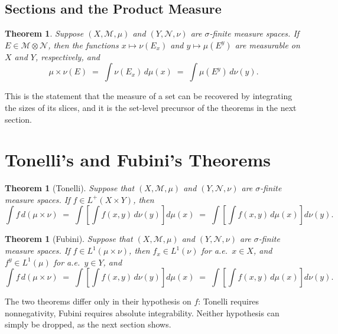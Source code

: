 \documentclass[11pt]{article}
\theoremstyle{definition}
\theoremstyle{plain}
\newtheorem{theorem}[definition]{Theorem}
\newcommand{\M}{\mathcal{M}}
\newcommand{\N}{\mathcal{N}}
\begin{document}
\subsection{Sections and the Product Measure}

\begin{theorem}
Suppose $(X,\M,\mu)$ and $(Y,\N,\nu)$ are $\sigma$-finite measure
spaces. If $E \in \M \otimes \N$, then the functions
$x \mapsto \nu(E_x)$ and $y \mapsto \mu(E^{y})$ are measurable on $X$
and $Y$, respectively, and
\[
  \mu \times \nu(E)
    \;=\; \int \nu(E_x) \,d\mu(x)
    \;=\; \int \mu(E^{y}) \,d\nu(y).
\]
\end{theorem}

This is the statement that the measure of a set can be recovered by
integrating the sizes of its slices, and it is the set-level precursor
of the theorems in the next section.

\section{Tonelli's and Fubini's Theorems}

\begin{theorem}[Tonelli]
Suppose that $(X,\M,\mu)$ and $(Y,\N,\nu)$ are $\sigma$-finite measure
spaces. If $f \in L^{+}(X \times Y)$, then
\[
  \int f \,d(\mu \times \nu)
    \;=\; \int \left[ \int f(x,y) \,d\nu(y) \right] d\mu(x)
    \;=\; \int \left[ \int f(x,y) \,d\mu(x) \right] d\nu(y).
\]
\end{theorem}

\begin{theorem}[Fubini]
Suppose that $(X,\M,\mu)$ and $(Y,\N,\nu)$ are $\sigma$-finite measure
spaces. If $f \in L^{1}(\mu \times \nu)$, then $f_x \in L^{1}(\nu)$ for
a.e.\ $x \in X$, and $f^{y} \in L^{1}(\mu)$ for a.e.\ $y \in Y$, and
\[
  \int f \,d(\mu \times \nu)
    \;=\; \int \left[ \int f(x,y) \,d\nu(y) \right] d\mu(x)
    \;=\; \int \left[ \int f(x,y) \,d\mu(x) \right] d\nu(y).
\]
\end{theorem}

The two theorems differ only in their hypothesis on $f$: Tonelli
requires nonnegativity, Fubini requires absolute integrability. Neither
hypothesis can simply be dropped, as the next section shows.

\end{document}
